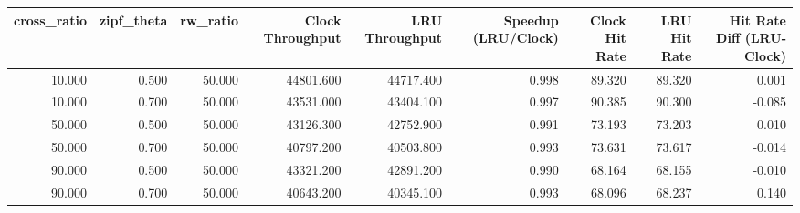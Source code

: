 \begin{tabular}{rrrrrrrrr}
\toprule
cross_ratio & zipf_theta & rw_ratio & Clock Throughput & LRU Throughput & Speedup (LRU/Clock) & Clock Hit Rate & LRU Hit Rate & Hit Rate Diff (LRU-Clock) \\
\midrule
10.000 & 0.500 & 50.000 & 44801.600 & 44717.400 & 0.998 & 89.320 & 89.320 & 0.001 \\
10.000 & 0.700 & 50.000 & 43531.000 & 43404.100 & 0.997 & 90.385 & 90.300 & -0.085 \\
50.000 & 0.500 & 50.000 & 43126.300 & 42752.900 & 0.991 & 73.193 & 73.203 & 0.010 \\
50.000 & 0.700 & 50.000 & 40797.200 & 40503.800 & 0.993 & 73.631 & 73.617 & -0.014 \\
90.000 & 0.500 & 50.000 & 43321.200 & 42891.200 & 0.990 & 68.164 & 68.155 & -0.010 \\
90.000 & 0.700 & 50.000 & 40643.200 & 40345.100 & 0.993 & 68.096 & 68.237 & 0.140 \\
\bottomrule
\end{tabular}
